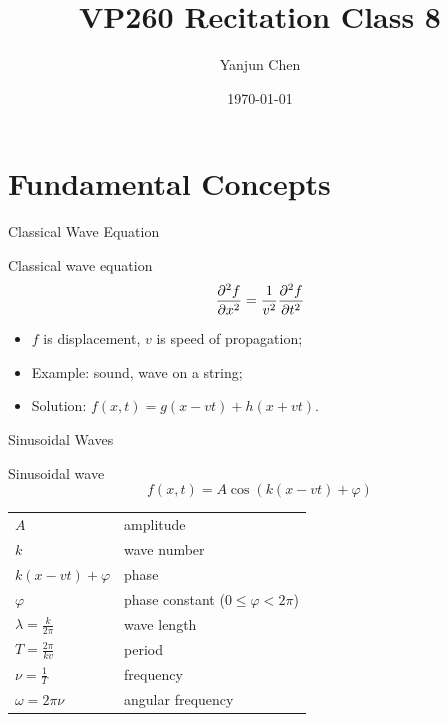 \documentclass{beamer}
\title[VP260 RC]{VP260 Recitation Class 8} %
\author{Yanjun Chen} %
\institute[UM-SJTU JI] %
{
    University of Michigan - Shanghai Jiao Tong University Joint Institute\\%
\medskip
}
\date{\today} %
\begin{document}
\begin{frame}
    \titlepage %
\end{frame}



\section{Fundamental Concepts} %

\begin{frame}{Classical Wave Equation}
    \begin{block}{Classical wave equation}
        \begin{equation}
            \pdv[2]{f}{x} = \frac{1}{v^2} \pdv[2]{f}{t}
        \end{equation}
    \end{block}
    \vfill
    \begin{itemize}
        \item $f$ is displacement, $v$ is speed of propagation;
        \item Example: sound, wave on a string;
        \item Solution: $f(x, t) = g(x - vt) + h(x + vt)$.
    \end{itemize}
\end{frame}


\begin{frame}{Sinusoidal Waves}
    \begin{block}{Sinusoidal wave}
        \begin{equation}
            f(x, t) = A \cos(k (x - vt) + \varphi)
        \end{equation}
    \end{block}

    
    \begin{table}[htbp]
        \centering
        \begin{tabular}{ll}
            $A$ & amplitude \\ 
            $k$ & wave number \\
            $k(x-vt)+\varphi$ & phase \\
            $\varphi$ & phase constant ($0 \leq \varphi < 2 \pi$)\\
            $\lambda = \frac{k}{2\pi}$ & wave length \\
            $T = \frac{2\pi}{kv}$ & period\\
            $\nu = \frac{1}{T}$ & frequency\\
            $\omega = 2\pi \nu$ & angular frequency\\
        \end{tabular}
    \end{table}

\end{frame}
\end{document}
